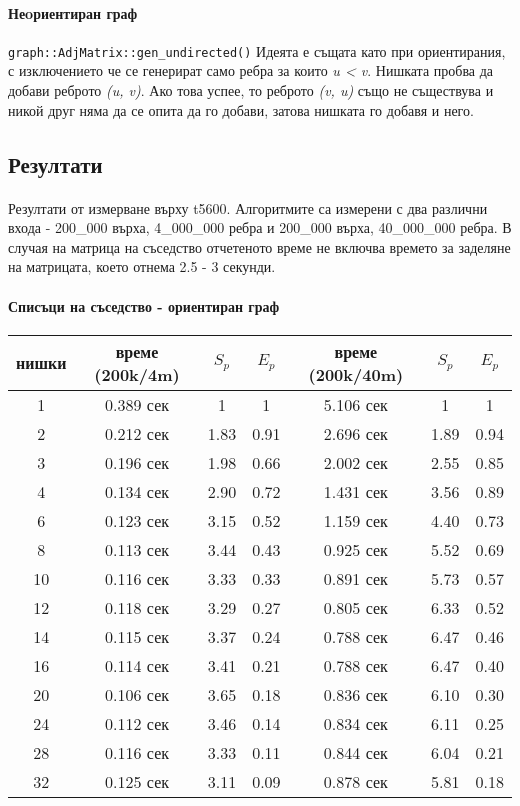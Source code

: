 \paragraph*{Неoриентиран граф} \verb|graph::AdjMatrix::gen_undirected()| Идеята е същата като при ориентирания, с изключението че се генерират само ребра за които \textit{u < v}. Нишката пробва да добави реброто \textit{(u, v)}. Ако това успее, то реброто \textit{(v, u)} също не съществува и никой друг няма да се опита да го добави, затова нишката го добавя и него.

\subsection{Резултати}

\paragraph*{} Резултати от измерване върху t5600. Алгоритмите са измерени с два различни входа - 200\_000 върха, 4\_000\_000 ребра и 200\_000 върха, 40\_000\_000 ребра. В случая на матрица на съседство отчетеното време не включва времето за заделяне на матрицата, което отнема 2.5 - 3 секунди.

\paragraph*{Списъци на съседство - ориентиран граф}

\begin{center}
\begin{tabular}{ c | c c c | c c c | }
  нишки & време (200k/4m) & $S_p$ & $E_p$ & време (200k/40m) & $S_p$ & $E_p$ \\
  \hline
  1  & 0.389 сек & 1 & 1 & 5.106 сек & 1 & 1 \\
  2  & 0.212 сек & 1.83 & 0.91 & 2.696 сек & 1.89 & 0.94 \\
  3  & 0.196 сек & 1.98 & 0.66 & 2.002 сек & 2.55 & 0.85 \\
  4  & 0.134 сек & 2.90 & 0.72 & 1.431 сек & 3.56 & 0.89 \\
  6  & 0.123 сек & 3.15 & 0.52 & 1.159 сек & 4.40 & 0.73 \\
  8  & 0.113 сек & 3.44 & 0.43 & 0.925 сек & 5.52 & 0.69 \\
  10 & 0.116 сек & 3.33 & 0.33 & 0.891 сек & 5.73 & 0.57 \\
  12 & 0.118 сек & 3.29 & 0.27 & 0.805 сек & 6.33 & 0.52 \\
  14 & 0.115 сек & 3.37 & 0.24 & 0.788 сек & 6.47 & 0.46 \\
  16 & 0.114 сек & 3.41 & 0.21 & 0.788 сек & 6.47 & 0.40 \\
  20 & 0.106 сек & 3.65 & 0.18 & 0.836 сек & 6.10 & 0.30 \\
  24 & 0.112 сек & 3.46 & 0.14 & 0.834 сек & 6.11 & 0.25 \\
  28 & 0.116 сек & 3.33 & 0.11 & 0.844 сек & 6.04 & 0.21 \\
  32 & 0.125 сек & 3.11 & 0.09 & 0.878 сек & 5.81 & 0.18 \\
\end{tabular}
\end{center}

